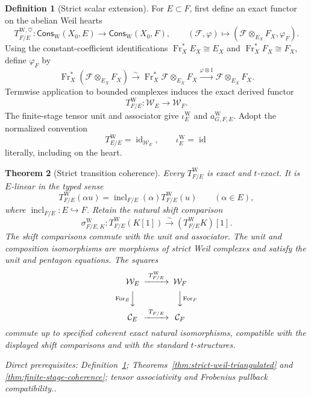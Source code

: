 \documentclass[10pt]{article}
\newtheorem{theorem}{Theorem}[section]
\theoremstyle{definition}
\newtheorem{definition}[theorem]{Definition}
\newcommand{\Cons}{\mathsf{Cons}}
\newcommand{\FrX}{\operatorname{Fr}_X}
\newcommand{\depends}[1]{\par\smallskip\noindent\textit{Direct prerequisites:} #1.}
\begin{document}
\begin{definition}[Strict scalar extension]\label{def:strict-scalar-extension}
For $E\subset F$, first define an exact functor on the abelian Weil hearts
\[
 T^{\mathrm W,\heartsuit}_{F/E}:
 \Cons_{\mathrm W}(X_0,E)\longrightarrow
 \Cons_{\mathrm W}(X_0,F),
 \qquad
 (\mathcal F,\varphi)\longmapsto
 (\mathcal F\otimes_{E_X}F_X,\varphi_F).
\]
Using the constant-coefficient identifications
$\FrX^*E_X\cong E_X$ and $\FrX^*F_X\cong F_X$, define $\varphi_F$ by
\[
 \FrX^*(\mathcal F\otimes_{E_X}F_X)
 \xrightarrow{\sim}\FrX^*\mathcal F\otimes_{E_X}F_X
 \xrightarrow{\varphi\otimes1}\mathcal F\otimes_{E_X}F_X.
\]
Termwise application to bounded complexes induces the exact derived functor
\[
 T^{\mathrm W}_{F/E}:\mathcal W_E\longrightarrow\mathcal W_F.
\]
The finite-stage tensor unit and associator give
$\iota_E^{\mathrm W}$ and $a_{G,F,E}^{\mathrm W}$.  Adopt the normalized
convention
\[
 T^{\mathrm W}_{E/E}=\operatorname{id}_{\mathcal W_E},
 \qquad \iota_E^{\mathrm W}=\operatorname{id}
\]
literally, including on the heart.
\end{definition}

\begin{theorem}[Strict transition coherence]
\label{thm:strict-transition-coherence}
Every $T^{\mathrm W}_{F/E}$ is exact and $t$-exact.  It is $E$-linear in the
typed sense
\[
 T^{\mathrm W}_{F/E}(\alpha u)
 =\operatorname{incl}_{F/E}(\alpha)T^{\mathrm W}_{F/E}(u)
 \qquad(\alpha\in E),
\]
where $\operatorname{incl}_{F/E}:E\hookrightarrow F$.  Retain the natural shift
comparison
\[
 \sigma^{\mathrm W}_{F/E,K}:
 T^{\mathrm W}_{F/E}(K[1])
 \xrightarrow{\sim}(T^{\mathrm W}_{F/E}K)[1].
\]
The shift comparisons commute with the unit and associator.  The unit and
composition isomorphisms are morphisms of strict Weil complexes and satisfy
the unit and pentagon equations.  The squares
\[
\begin{CD}
 \mathcal W_E @>{T^{\mathrm W}_{F/E}}>> \mathcal W_F\\
 @V{\operatorname{For}_E}VV @VV{\operatorname{For}_F}V\\
 \mathcal C_E @>{T_{F/E}}>> \mathcal C_F
\end{CD}
\]
commute up to specified coherent exact natural isomorphisms, compatible
with the displayed shift comparisons and with the standard $t$-structures.
\depends{Definition~\ref{def:strict-scalar-extension};
Theorems~\ref{thm:strict-weil-triangulated} and
\ref{thm:finite-stage-coherence}; tensor associativity and Frobenius
pullback compatibility.}
\end{theorem}
\end{document}
